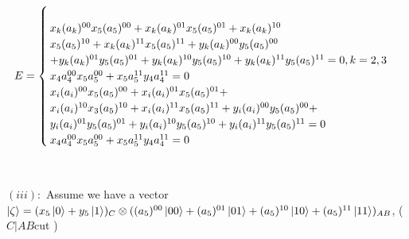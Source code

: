 \documentclass[a4paper,12pt]{article}
\begin{document}
\begin{equation}
E=\begin{cases}
\newline \\
x_{k}(a_{k})^{00}x_{5}(a_{5})^{00}+x_{k}(a_{k})^{01}x_{5}(a_{5})^{01}+x_{k}(a_{k})^{10}\\
x_{5}(a_{5})^{10}+x_{k}(a_{k})^{11}x_{5}(a_{5})^{11}+y_{k}(a_{k})^{00}y_{5}(a_{5})^{00}\\+
y_{k}(a_{k})^{01}y_{5}(a_{5})^{01}+y_{k}(a_{k})^{10}y_{5}(a_{5})^{10}+y_{k}(a_{k})^{11}
y_{5}(a_{5})^{11}=0 
, k=2,3
\newline \\
x_{4}a_{4}^{00}x_{5}a_{5}^{00}+x_{5}a_{5}^{11}y_{4}a_{4}^{11}=0
\newline \\
x_{i}(a_{i})^{00}x_{5}(a_{5})^{00}+x_{i}(a_{i})^{01}x_{5}(a_{5})^{01}+\\x_{i}(a_{i})^{10}x_{3}(a_{5})^{10}+x_{i}(a_{i})^{11}x_{5}(a_{5})^{11}+y_{i}(a_{i})^{00}y_{5}(a_{5})^{00}+\\y_{i}(a_{i})^{01}y_{5}(a_{5})^{01}+y_{i}(a_{i})^{10}y_{5}(a_{5})^{10}+y_{i}(a_{i})^{11}y_{5}(a_{5})^{11}=0
\newline\\
x_{4}a_{4}^{00}x_{5}a_{5}^{00}+x_{5}a_{5}^{11}y_{4}a_{4}^{11}=0
\end{cases}
\end{equation}
\leavevmode\\













\leavevmode
\newline \\
$(iii)    :$ Assume we have a vector $\ket{\zeta}=(x_{5}\ket{0}+y_{5}\ket{1})_{C}\otimes ((a_{5})^{00}\ket{00}+(a_{5})^{01}\ket{01}+(a_{5})^{10}\ket{10}+(a_{5})^{11}\ket{11})_{AB}$,   ( $      C|AB   $cut   )
\leavevmode
\newline \\
\end{document}
